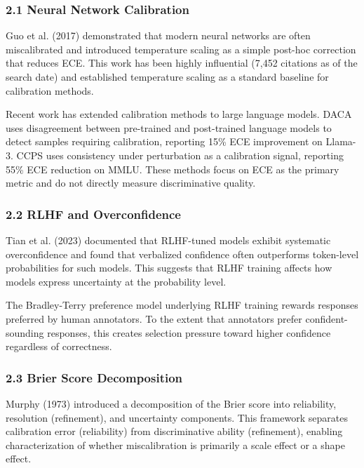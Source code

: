 
\subsubsection{2.1 Neural Network Calibration}

Guo et al. (2017) demonstrated that modern neural networks are often miscalibrated and introduced temperature scaling as a simple post-hoc correction that reduces ECE. This work has been highly influential (7,452 citations as of the search date) and established temperature scaling as a standard baseline for calibration methods.

Recent work has extended calibration methods to large language models. DACA \citep{Luo2025DACA} uses disagreement between pre-trained and post-trained language models to detect samples requiring calibration, reporting 15\% ECE improvement on Llama-3. CCPS \citep{Khanmohammadi2025CCPS} uses consistency under perturbation as a calibration signal, reporting 55\% ECE reduction on MMLU. These methods focus on ECE as the primary metric and do not directly measure discriminative quality.

\subsubsection{2.2 RLHF and Overconfidence}

Tian et al. (2023) documented that RLHF-tuned models exhibit systematic overconfidence and found that verbalized confidence often outperforms token-level probabilities for such models. This suggests that RLHF training affects how models express uncertainty at the probability level.

The Bradley-Terry preference model underlying RLHF training rewards responses preferred by human annotators. To the extent that annotators prefer confident-sounding responses, this creates selection pressure toward higher confidence regardless of correctness.

\subsubsection{2.3 Brier Score Decomposition}

Murphy (1973) introduced a decomposition of the Brier score into reliability, resolution (refinement), and uncertainty components. This framework separates calibration error (reliability) from discriminative ability (refinement), enabling characterization of whether miscalibration is primarily a scale effect or a shape effect.

